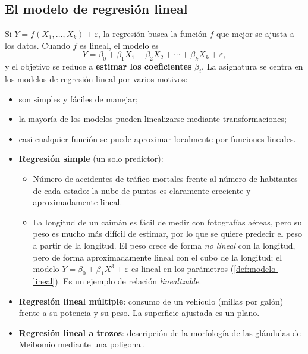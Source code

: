 \subsection{El modelo de regresión lineal}

Si $Y=f(X_1,\ldots,X_k)+\varepsilon$, la regresión busca la función $f$ que mejor se ajusta a
los datos. Cuando $f$ es lineal, el modelo es
\[
  Y = \beta_0 + \beta_1X_1 + \beta_2X_2 + \cdots + \beta_kX_k + \varepsilon,
\]
y el objetivo se reduce a \textbf{estimar los coeficientes} $\beta_i$. La asignatura se centra
en los modelos de regresión lineal por varios motivos:
\begin{itemize}
  \item son simples y fáciles de manejar;
  \item la mayoría de los modelos pueden linealizarse mediante transformaciones;
  \item casi cualquier función se puede aproximar localmente por funciones lineales.
\end{itemize}

\begin{ejemplo}
  \begin{itemize}
    \item \textbf{Regresión simple} (un solo predictor):
      \begin{itemize}
        \item Número de accidentes de tráfico mortales frente al número de habitantes de cada
          estado: la nube de puntos es claramente creciente y aproximadamente lineal.
        \item La longitud de un caimán es fácil de medir con fotografías aéreas, pero su peso
          es mucho más difícil de estimar, por lo que se quiere predecir el peso a partir de
          la longitud. El peso crece de forma \emph{no lineal} con la longitud, pero de forma
          aproximadamente lineal con el cubo de la longitud; el modelo
          $Y=\beta_0+\beta_1X^3+\varepsilon$ es lineal en los parámetros
          (\cref{def:modelo-lineal}). Es un ejemplo de relación \emph{linealizable}.
      \end{itemize}
    \item \textbf{Regresión lineal múltiple}: consumo de un vehículo (millas por galón) frente
      a su potencia y su peso. La superficie ajustada es un plano.
    \item \textbf{Regresión lineal a trozos}: descripción de la morfología de las glándulas de
      Meibomio mediante una poligonal.
  \end{itemize}
\end{ejemplo}
